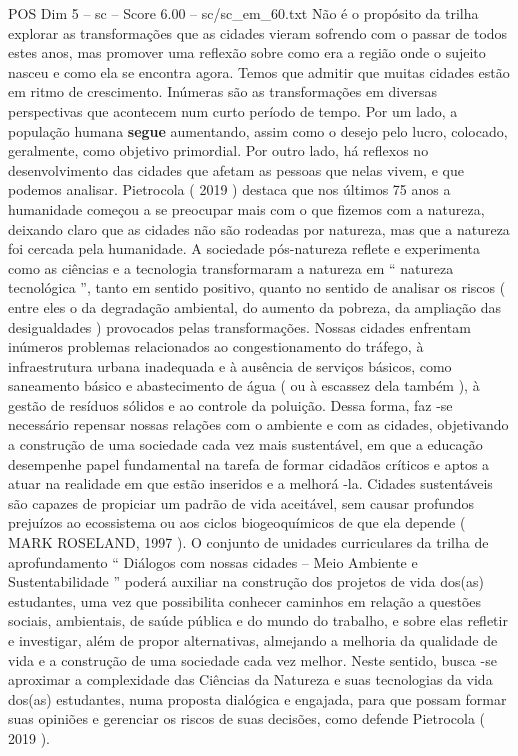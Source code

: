 \begin{textsample}{POS Dim 5 – sc – Score 6.00 – sc/sc\_em\_60.txt}
Não é o propósito da trilha explorar as transformações que as cidades vieram sofrendo com o passar de todos estes anos, mas promover uma reflexão sobre como era a região onde o sujeito nasceu e como ela se encontra agora.
Temos que admitir que muitas cidades estão em ritmo de crescimento.
Inúmeras são as transformações em diversas perspectivas que acontecem num curto período de tempo.
Por um lado, a população humana \textbf{segue} aumentando, assim como o desejo pelo lucro, colocado, geralmente, como objetivo primordial.
Por outro lado, há reflexos no desenvolvimento das cidades que afetam as pessoas que nelas vivem, e que podemos analisar.
Pietrocola ( 2019 ) destaca que nos últimos 75 anos a humanidade começou a se preocupar mais com o que fizemos com a natureza, deixando claro que as cidades não são rodeadas por natureza, mas que a natureza foi cercada pela humanidade.
A sociedade pós-natureza reflete e experimenta como as ciências e a tecnologia transformaram a natureza em “ natureza tecnológica ”, tanto em sentido positivo, quanto no sentido de analisar os riscos ( entre eles o da degradação ambiental, do aumento da pobreza, da ampliação das desigualdades ) provocados pelas transformações.
Nossas cidades enfrentam inúmeros problemas relacionados ao congestionamento do tráfego, à infraestrutura urbana inadequada e à ausência de serviços básicos, como saneamento básico e abastecimento de água ( ou à escassez dela também ), à gestão de resíduos sólidos e ao controle da poluição.
Dessa forma, faz -se necessário repensar nossas relações com o ambiente e com as cidades, objetivando a construção de uma sociedade cada vez mais sustentável, em que a educação desempenhe papel fundamental na tarefa de formar cidadãos críticos e aptos a atuar na realidade em que estão inseridos e a melhorá -la.
Cidades sustentáveis são capazes de propiciar um padrão de vida aceitável, sem causar profundos prejuízos ao ecossistema ou aos ciclos biogeoquímicos de que ela depende ( MARK ROSELAND, 1997 ).
O conjunto de unidades curriculares da trilha de aprofundamento “ Diálogos com nossas cidades – Meio Ambiente e Sustentabilidade ” poderá auxiliar na construção dos projetos de vida dos(as) estudantes, uma vez que possibilita conhecer caminhos em relação a questões sociais, ambientais, de saúde pública e do mundo do trabalho, e sobre elas refletir e investigar, além de propor alternativas, almejando a melhoria da qualidade de vida e a construção de uma sociedade cada vez melhor.
Neste sentido, busca -se aproximar a complexidade das Ciências da Natureza e suas tecnologias da vida dos(as) estudantes, numa proposta dialógica e engajada, para que possam formar suas opiniões e gerenciar os riscos de suas decisões, como defende Pietrocola ( 2019 ).

\end{textsample}
